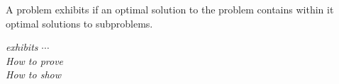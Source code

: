 
\begin{frame}{}
  \begin{definition}
    A problem exhibits \textbf{\emph{}} if
    an optimal solution to the problem contains within it optimal solutions to subproblems.
  \end{definition}

  \pause
  \vspace{0.30cm}
  \begin{center}
    {\it {} exhibits $\cdots$} \\[6pt]
    {\it How to prove } \\[6pt]
    {\it How to show }  \\[30pt]

    \pause
  \end{center}
\end{frame}
